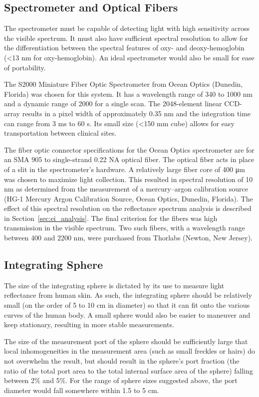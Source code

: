 \subsection{Spectrometer and Optical Fibers}
The spectrometer must be capable of detecting light with high sensitivity across the visible spectrum. It must also have sufficient spectral resolution to allow for the differentiation between the spectral features of oxy- and deoxy-hemoglobin (<13 nm for oxy-hemoglobin). An ideal spectrometer would also be small for ease of portability.

The S2000 Miniature Fiber Optic Spectrometer from Ocean Optics (Dunedin, Florida) was chosen for this system. It has a wavelength range of 340 to 1000 nm and a dynamic range of 2000 for a single scan. The 2048-element linear CCD-array results in a pixel width of approximately 0.35 nm and the integration time can range from 3 ms to 60 s. Its small size (<150 mm cube) allows for easy transportation between clinical sites.

The fiber optic connector specifications for the Ocean Optics spectrometer are for an SMA 905 to single-strand 0.22 NA optical fiber. The optical fiber acts in place of a slit in the spectrometer’s hardware. A relatively large fiber core of 400 \si{\um} was chosen to maximize light collection. This resulted in spectral resolution of 10 nm as determined from the measurement of a mercury–argon calibration source (HG-1 Mercury Argon Calibration Source, Ocean Optics, Dunedin, Florida). The effect of this spectral resolution on the reflectance spectrum analysis is described in Section~\ref{sec:ei_analysis}. The final criterion for the fibers was high transmission in the visible spectrum. Two such fibers, with a wavelength range between 400 and 2200 nm, were purchased from Thorlabs (Newton, New Jersey).

\subsection{Integrating Sphere}
The size of the integrating sphere is dictated by its use to measure light reflectance from human skin. As such, the integrating sphere should be relatively small (on the order of 5 to 10 cm in diameter) so that it can fit onto the various curves of the human body. A small sphere would also be easier to maneuver and keep stationary, resulting in more stable measurements.

The size of the measurement port of the sphere should be sufficiently large that local inhomogeneities in the measurement area (such as small freckles or hairs) do not overwhelm the result, but should result in the sphere’s port fraction (the ratio of the total port area to the total internal surface area of the sphere) falling between 2\% and 5\%.\cite{Hanssen2002} For the range of sphere sizes suggested above, the port diameter would fall somewhere within 1.5 to 5 cm.

